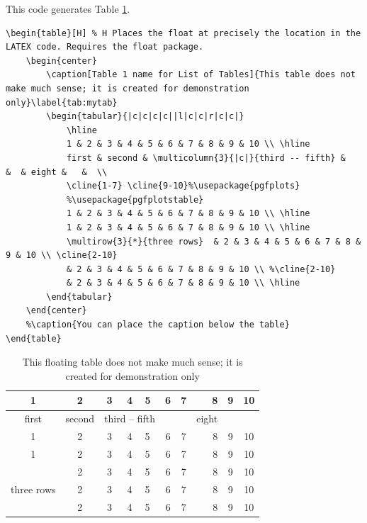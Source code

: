 \documentclass[a4paper,11pt]{article}
\begin{document}
This code generates Table \ref{tab:mytab}.

\begin{lstlisting}[breaklines]
\begin{table}[H] % H Places the float at precisely the location in the LATEX code. Requires the float package.
	\begin{center}
		\caption[Table 1 name for List of Tables]{This table does not make much sense; it is created for demonstration only}\label{tab:mytab}
		\begin{tabular}{|c|c|c|c||l|c|c|r|c|c|}
			\hline
			1 & 2 & 3 & 4 & 5 & 6 & 7 & 8 & 9 & 10 \\ \hline
			first & second & \multicolumn{3}{|c|}{third -- fifth} &   &  & eight &   &  \\ 
			\cline{1-7} \cline{9-10}%\usepackage{pgfplots}
			%\usepackage{pgfplotstable}
			1 & 2 & 3 & 4 & 5 & 6 & 7 & 8 & 9 & 10 \\ \hline
			1 & 2 & 3 & 4 & 5 & 6 & 7 & 8 & 9 & 10 \\ \hline
			\multirow{3}{*}{three rows}  & 2 & 3 & 4 & 5 & 6 & 7 & 8 & 9 & 10 \\ \cline{2-10}
			& 2 & 3 & 4 & 5 & 6 & 7 & 8 & 9 & 10 \\ %\cline{2-10}
			& 2 & 3 & 4 & 5 & 6 & 7 & 8 & 9 & 10 \\ \hline
		\end{tabular}
	\end{center}
	%\caption{You can place the caption below the table}
\end{table}
\end{lstlisting}

\begin{table}[H] %
	\begin{center}
		\caption[Table 1 name for List of Tables]{This floating table does not make much sense; it is created for demonstration only}\label{tab:mytab}
		\begin{tabular}{|c|c|c|c||l|c|c|r|c|c|}
			\hline\setlength\fboxsep{3pt} %
			\setlength\fboxrule{1pt} %
			1 & 2 & 3 & 4 & 5 & 6 & 7 & 8 & 9 & 10 \\ \hline
			first & second & \multicolumn{3}{|c|}{third -- fifth} &   &  & eight &   &  \\ 
			\cline{1-7} \cline{9-10}
			1 & 2 & 3 & 4 & 5 & 6 & 7 & 8 & 9 & 10 \\ \hline
			1 & 2 & 3 & 4 & 5 & 6 & 7 & 8 & 9 & 10 \\ \hline
			\multirow{3}{*}{three rows}  & 2 & 3 & 4 & 5 & 6 & 7 & 8 & 9 & 10 \\ \cline{2-10}
			& 2 & 3 & 4 & 5 & 6 & 7 & 8 & 9 & 10 \\ %
			& 2 & 3 & 4 & 5 & 6 & 7 & 8 & 9 & 10 \\ \hline
		\end{tabular}
	\end{center}
\end{table}
\end{document}
